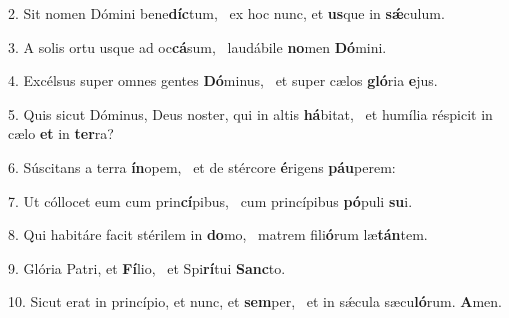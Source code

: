 2. Sit nomen Dómini bene\textbf{díc}tum, \ast\  ex hoc nunc, et \textbf{us}que in \textbf{sǽ}culum.\

3. A solis ortu usque ad oc\textbf{cá}sum, \ast\  laudábile \textbf{no}men \textbf{Dó}mini.\

4. Excélsus super omnes gentes \textbf{Dó}minus, \ast\  et super cælos \textbf{gló}ria \textbf{e}jus.\

5. Quis sicut Dóminus, Deus noster, qui in altis \textbf{há}bitat, \ast\  et humília réspicit in cælo \textbf{et} in \textbf{ter}ra?\

6. Súscitans a terra \textbf{ín}opem, \ast\  et de stércore \textbf{é}rigens \textbf{páu}perem:\

7. Ut cóllocet eum cum prin\textbf{cí}pibus, \ast\  cum princípibus \textbf{pó}puli \textbf{su}i.\

8. Qui habitáre facit stérilem in \textbf{do}mo, \ast\  matrem fili\textbf{ó}rum læ\textbf{tán}tem.\

9. Glória Patri, et \textbf{Fí}lio, \ast\  et Spi\textbf{rí}tui \textbf{Sanc}to.\

10. Sicut erat in princípio, et nunc, et \textbf{sem}per, \ast\  et in sǽcula sæcu\textbf{ló}rum. \textbf{A}men.\

